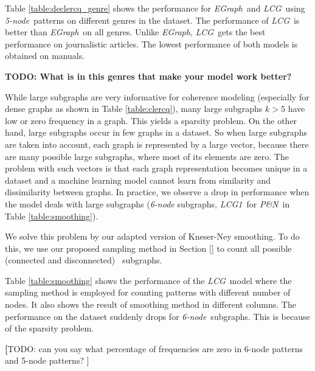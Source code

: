 Table \ref{table:declercq_genre} shows the performance for \emph{EGraph}\ and \emph{LCG}\ using \emph{5-node}\ patterns on different genres in the \declercqds dataset. 
The performance of \emph{LCG}\ is better than \emph{EGraph}\ on all genres. 
Unlike \emph{EGraph}, \emph{LCG}\ gets the best performance on journalistic articles. 
The lowest performance of both models is obtained on manuals. 

\textbf{TODO: What is in this genres that make your model work better?}

While large subgraphs are very informative for coherence modeling (especially for dense graphs as shown in Table \ref{table:clercq}), many large subgraphs $k>5$ have low or zero frequency in a graph.
This yields a sparsity problem. 
On the other hand, large subgraphs occur in few graphs in a dataset. 
So when large subgraphs are taken into account, each graph is represented by a large vector, because there are many possible large subgraphs, where most of its elements are zero.   
The problem with such vectors is that each graph representation becomes unique in a dataset and a machine learning model cannot learn from similarity and dissimilarity between graphs. 
In practice, we observe a drop in performance when the model deals with large subgraphs (\emph{6-node} subgraphs, \emph{LCG1}\ for \emph{P\&N}\ in Table \ref{table:smoothing}). 

We solve this problem by our adapted version of \mbox{Kneser-Ney} smoothing. 
To do this, we use our proposed sampling method in Section \ref{} to count all possible (connected and disconnected) \knode\ subgraphs. 

Table \ref{table:smoothing} shows the performance of the \emph{LCG}\ model where the sampling method is employed for counting patterns with different number of nodes. 
It also shows the result of smoothing method in different columns. 
The performance on the \pitlerds dataset suddenly drops for \emph{6-node}\ subgraphs. 
This is because of the sparsity problem. 

\textbf[TODO: can you say what percentage of frequencies are zero in 6-node patterns and 5-node patterns? ]


